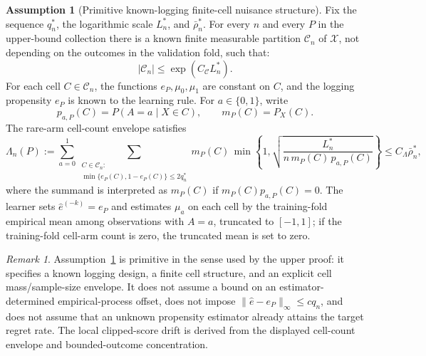 \documentclass[11pt]{article}
\theoremstyle{definition}
\newtheorem{assumption}{Assumption}
\theoremstyle{plain}
\theoremstyle{remark}
\newtheorem{remark}{Remark}
\begin{document}
\begin{assumption}[Primitive known-logging finite-cell nuisance structure]\label{ass:nuisance}
Fix the sequence \(q_n^*\), the logarithmic scale \(L_n^*\), and
\(\bar\rho_n^*\).  For every \(n\) and every \(P\) in the upper-bound
collection there is a known finite measurable partition
\(\mathscr C_n\) of \(\mathcal X\), not depending on the outcomes in the
validation fold, such that:
\[
|\mathscr C_n|\le \exp(C_{\mathscr C}L_n^*).
\]
For each cell \(C\in\mathscr C_n\), the functions
\(e_P,\mu_0,\mu_1\) are constant on \(C\), and the logging propensity
\(e_P\) is known to the learning rule.  For \(a\in\{0,1\}\), write
\[
p_{a,P}(C)=P(A=a\mid X\in C),\qquad m_P(C)=P_X(C).
\]
The rare-arm cell-count envelope satisfies
\[
\Lambda_n(P):=
\sum_{a=0}^1
\sum_{\substack{C\in\mathscr C_n:\\
\min\{e_P(C),1-e_P(C)\}\le 2q_n^*}}
m_P(C)\,
\min\left\{1,
\sqrt{\frac{L_n^*}{n\,m_P(C)\,p_{a,P}(C)}}\right\}
\le C_\Lambda \bar\rho_n^*,
\]
where the summand is interpreted as \(m_P(C)\) if
\(m_P(C)p_{a,P}(C)=0\).  The learner sets
\(\widehat e^{(-k)}=e_P\) and estimates \(\mu_a\) on each cell by the
training-fold empirical mean among observations with \(A=a\), truncated to
\([-1,1]\); if the training-fold cell-arm count is zero, the truncated mean
is set to zero.
\end{assumption}

\begin{remark}
Assumption~\ref{ass:nuisance} is primitive in the sense used by the upper
proof: it specifies a known logging design, a finite cell structure, and an
explicit cell mass/sample-size envelope.  It does not assume a bound on an
estimator-determined empirical-process offset, does not impose
\(\|\widehat e-e_P\|_\infty\le c q_n\), and does not assume that an unknown
propensity estimator already attains the target regret rate.  The local
clipped-score drift is derived from the displayed cell-count envelope and
bounded-outcome concentration.
\end{remark}
\end{document}

